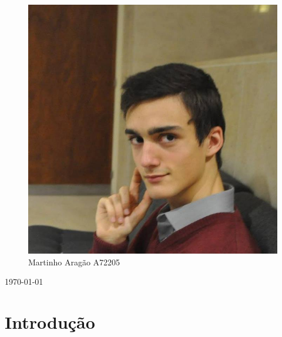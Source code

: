 \documentclass{article}
\begin{document}
\begin{titlepage}
\begin{figure}[!htb]
  \includegraphics[width=\linewidth]{martinho.jpg}
  \caption{Martinho Aragão A72205}
\endminipage
\end{figure}

{\large \today}\\[3cm] %


\vfill %

\end{titlepage}

\tableofcontents

\pagebreak

\section{Introdução}
\end{document}
